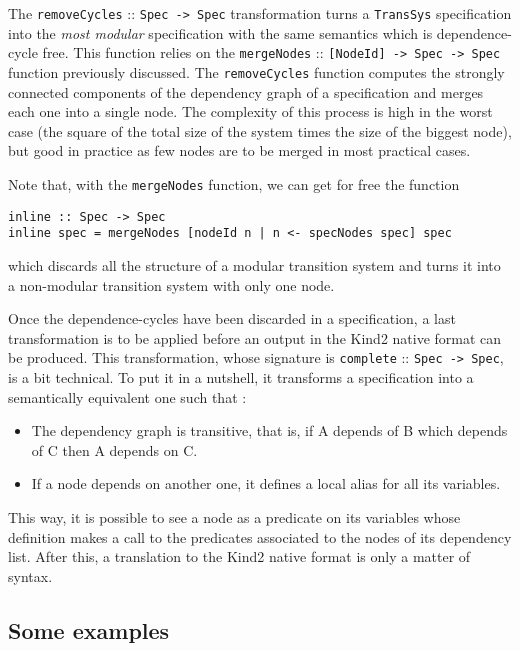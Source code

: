 The \texttt{removeCycles} :: \texttt{Spec -> Spec} transformation turns a \texttt{TransSys} specification into the \textit{most modular} specification with the same semantics which is dependence-cycle free. This function relies on the \texttt{mergeNodes} :: \texttt{[NodeId] -> Spec -> Spec} function previously discussed. The \texttt{removeCycles} function computes the strongly connected components of the dependency graph of a specification and merges each one into a single node. The complexity of this process is high in the worst case (the square of the total size of the system times the size of the biggest node), but good in practice as few nodes are to be merged in most practical cases.

Note that, with the \texttt{mergeNodes} function, we can get for free the function
\begin{lstlisting}[frame=single]
inline :: Spec -> Spec
inline spec = mergeNodes [nodeId n | n <- specNodes spec] spec
\end{lstlisting}
which discards all the structure of a modular transition system and turns it into a non-modular transition system with only one node.

\bigskip


Once the dependence-cycles have been discarded in a specification, a last transformation is to be applied before an output in the Kind2 native format can be produced. This transformation, whose signature is  \texttt{complete} :: \texttt{Spec -> Spec}, is a bit technical. To put it in a nutshell, it transforms a specification into a semantically equivalent one such that :

\begin{itemize}
\item The dependency graph is transitive, that is, if A depends of B which depends of C then A depends on C.
\item If a node depends on another one, it defines a local alias for all its variables.
\end{itemize}
This way, it is possible to see a node as a predicate on its variables whose definition makes a call to the predicates associated to the nodes of its dependency list. After this, a translation to the Kind2 native format is only a matter of syntax.

\subsection{Some examples}




